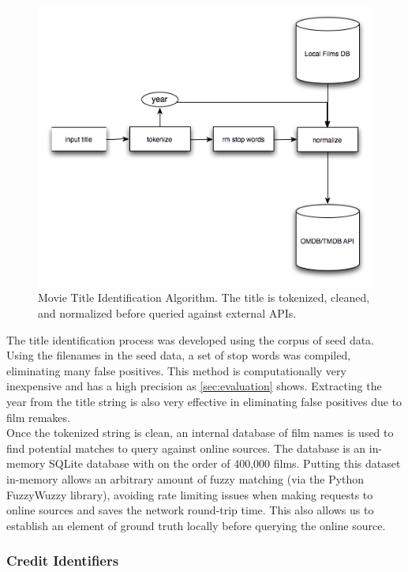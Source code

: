 \documentclass[paper=a4, fontsize=11pt]{scrartcl} %
\numberwithin{equation}{section} %
\numberwithin{figure}{section} %
\numberwithin{table}{section} %
\begin{document}
\begin{figure}[H]
\center\includegraphics[scale=0.90]{title-identifier.png}
\caption{Movie Title Identification Algorithm. The title is tokenized, cleaned, and normalized before queried against external APIs.}
\label{fig:title-identifier}
\end{figure}


The title identification process was developed using the corpus of seed data. Using the filenames in the seed data, a set of stop words was compiled, eliminating many false positives. This method is computationally very inexpensive and has a high precision as \ref{sec:evaluation} shows. Extracting the year from the title string is also very effective in eliminating false positives due to film remakes. \\

Once the tokenized string is clean, an internal database of film names is used to find potential matches to query against online sources. The database is an in-memory SQLite database with on the order of 400,000 films. Putting this dataset in-memory allows an arbitrary amount of fuzzy matching (via the Python FuzzyWuzzy library), avoiding rate limiting issues when making requests to online sources and saves the network round-trip time. This also allows us to establish an element of ground truth locally before querying the online source. \\

\subsubsection{Credit Identifiers}
\label{sec:credit-identifier}
\end{document}
